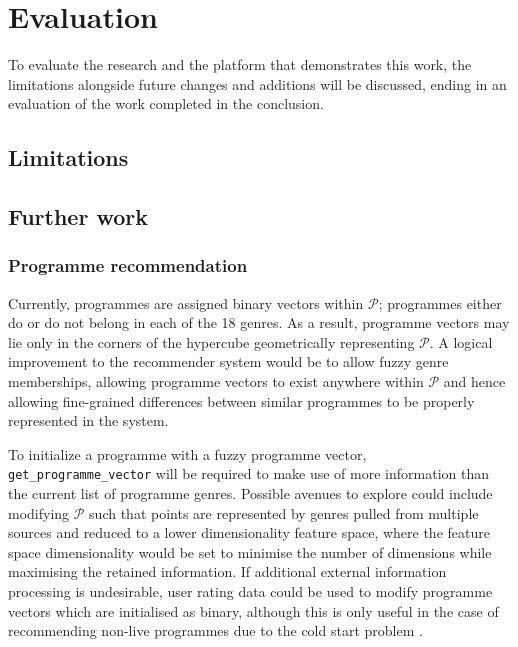 \section{Evaluation}
	To evaluate the research and the platform that demonstrates this work, the limitations alongside future changes and additions will be discussed, ending in an evaluation of the work completed in the conclusion.
	\subsection{Limitations}
	\subsection{Further work}
		\subsubsection{Programme recommendation}
		\label{sec:further_work_recommender}

		Currently, programmes are assigned binary vectors within $\mathcal{P}$; programmes either do or do not belong in each of the 18 genres. As a result, programme vectors may lie only in the corners of the hypercube geometrically representing $\mathcal{P}$. A logical improvement to the recommender system would be to allow fuzzy genre memberships, allowing programme vectors to exist anywhere within $\mathcal{P}$ and hence allowing fine-grained differences between similar programmes to be properly represented in the system.
		
		To initialize a programme with a fuzzy programme vector, \texttt{get\_programme\_vector} will be required to make use of more information than the current list of programme genres. Possible avenues to explore could include modifying $\mathcal{P}$ such that points are represented by genres pulled from multiple sources and reduced to a lower dimensionality feature space, where the feature space dimensionality would be set to minimise the number of dimensions while maximising the retained information. If additional external information processing is undesirable, user rating data could be used to modify programme vectors which are initialised as binary, although this is only useful in the case of recommending non-live programmes due to the cold start problem \citep{cold-start-problem}.

